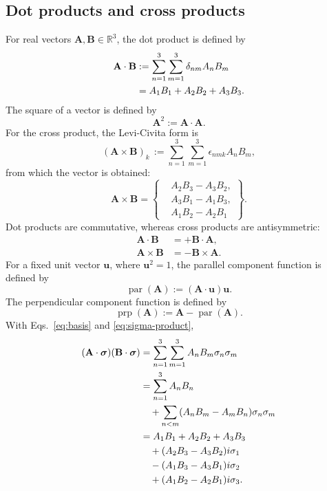 \documentclass[10pt,letterpaper]{article}
\newcommand{\eqfunc}[1]{\operatorname{#1}}
\newcommand{\R}{\mathbb{R}}
\newcommand{\pv}[1]{#1}
\newcommand{\vct}[1]{\mathbf{#1}}
\newcommand{\sigv}{\vct{\pv{\bm{\sigma}}}}
\newcommand{\vthreeeq}[3]{%
  \left\{%
  \begin{aligned}
  & #1,\\[0.12em]
  & #2,\\[0.12em]
  & #3
  \end{aligned}%
  \right\}%
}
\begin{document}
\subsection{Dot products and cross products}
For real vectors \(\vct{A},\vct{B}\in\R^3\), the dot product is defined by
\begin{align}
\vct{A}\cdot\vct{B}
&:= \sum_{n=1}^3\sum_{m=1}^3\delta_{nm}A_nB_m \notag\\
&= A_1B_1+A_2B_2+A_3B_3.
\label{eq:vector-dot-norm}
\end{align}
The square of a vector is defined by
\begin{equation}
\vct{A}^2:=\vct{A}\cdot\vct{A}.
\label{eq:vector-square}
\end{equation}
\noindent For the cross product, the Levi-Civita form is
\begin{equation}
(\vct{A}\times\vct{B})_k
\,:= \sum_{n=1}^3\sum_{m=1}^3\epsilon_{nmk}A_nB_m,
\label{eq:cross-product-definition}
\end{equation}
from which the vector is obtained:
\begin{equation}
\vct{A}\times\vct{B}=
\vthreeeq
{A_2B_3-A_3B_2}
{A_3B_1-A_1B_3}
{A_1B_2-A_2B_1}.
\label{eq:cross-product}
\end{equation}
Dot products are commutative, whereas cross products are antisymmetric:
\begin{align*}
\vct{A}\cdot\vct{B} &= +\vct{B}\cdot\vct{A},\\
\vct{A}\times\vct{B} &= -\vct{B}\times\vct{A}.
\end{align*}
For a fixed unit vector \(\vct{u}\), where \(\vct{u}^2=1\), the parallel
component function is defined by
\begin{equation}
\eqfunc{par}(\vct{A}):=(\vct{A}\cdot\vct{u})\vct{u}.
\label{eq:par-function}
\end{equation}
The perpendicular component function is defined by
\begin{equation}
\eqfunc{prp}(\vct{A}):=\vct{A}-\eqfunc{par}(\vct{A}).
\label{eq:prp-function}
\end{equation}
With Eqs.\ \eqref{eq:basis} and \eqref{eq:sigma-product},
\begin{align*}
(\vct{A}\cdot\sigv)(\vct{B}\cdot\sigv)
&= \sum_{n=1}^3\sum_{m=1}^3 A_n B_m \pv{\sigma}_n \pv{\sigma}_m \notag\\
&= \sum_{n=1}^3 A_n B_n \notag\\
&\quad + \sum_{n<m}(A_n B_m-A_m B_n)\pv{\sigma}_n \pv{\sigma}_m \notag\\
&= A_1B_1+A_2B_2+A_3B_3 \notag\\
&\quad + (A_2B_3-A_3B_2)i\pv{\sigma}_1 \notag\\
&\quad - (A_1B_3-A_3B_1)i\pv{\sigma}_2 \notag\\
&\quad + (A_1B_2-A_2B_1)i\pv{\sigma}_3.
\end{align*}
\end{document}

